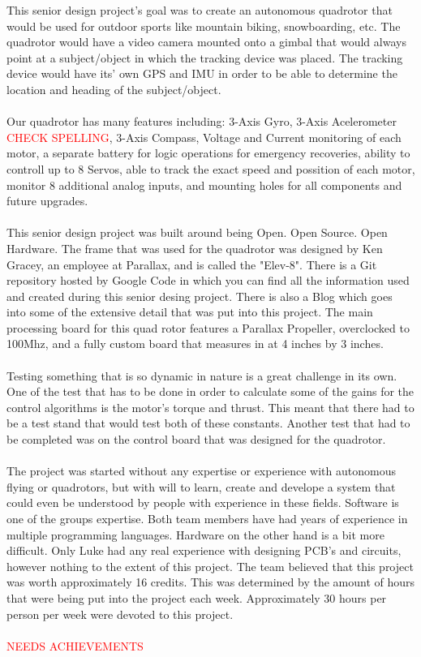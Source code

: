 \documentclass{article}
\numberwithin{equation}{section} %
\begin{document}
This senior design project's goal was to create an autonomous quadrotor that would be used for outdoor sports like mountain biking, snowboarding, etc. The quadrotor would have a video camera mounted onto a gimbal that would always point at a subject/object in which the tracking device was placed. The tracking device would have its' own GPS and IMU in order to be able to determine the location and heading of the subject/object.\\ \\
Our quadrotor has many features including: 3-Axis Gyro, 3-Axis Acelerometer \textcolor{red}{CHECK SPELLING}, 3-Axis Compass, Voltage and Current monitoring of each motor, a separate battery for logic operations for emergency recoveries, ability to controll up to 8 Servos, able to track the exact speed and possition of each motor, monitor 8 additional analog inputs, and mounting holes for all components and future upgrades. \\ \\
This senior design project was built around being Open. Open Source. Open Hardware. The frame that was used for the quadrotor was designed by Ken Gracey, an employee at Parallax, and is called the "Elev-8". There is a Git repository hosted by Google Code in which you can find all the information used and created during this senior desing project. There is also a Blog which goes into some of the extensive detail that was put into this project. The main processing board for this quad rotor features a Parallax Propeller, overclocked to 100Mhz, and a fully custom board that measures in at 4 inches by 3 inches. \\ \\
Testing something that is so dynamic in nature is a great challenge in its own. One of the test that has to be done in order to calculate some of the gains for the control algorithms is the motor's torque and thrust. This meant that there had to be a test stand that would test both of these constants. Another test that had to be completed was on the control board that was designed for the quadrotor. \\ \\
The project was started without any expertise or experience with autonomous flying or quadrotors, but with will to learn, create and develope a system that could even be understood by people with experience in these fields. Software is one of the groups expertise. Both team members have had years of experience in multiple programming languages. Hardware on the other hand is a bit more difficult. Only Luke had any real experience with designing PCB's and circuits, however nothing to the extent of this project. The team believed that this project was worth approximately 16 credits. This was determined by the amount of hours that were being put into the project each week. Approximately 30 hours per person per week were devoted to this project. \\ \\
\textcolor{red}{NEEDS ACHIEVEMENTS}
\end{document}
